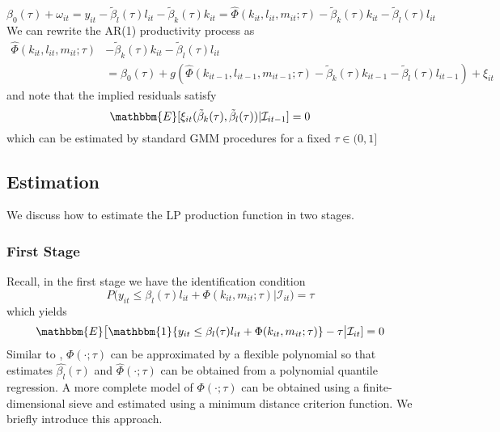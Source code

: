 \documentclass[11pt]{article}
\begin{document}
\begin{equation}
\beta_{0}(\tau)+\omega_{it}=y_{it}-\tilde{\beta}_{l}(\tau)l_{it}-\tilde{\beta}_{k}(\tau)k_{it}=\hat{\Phi}(k_{it}, l_{it}, m_{it}; \tau)-\tilde{\beta}_{k}(\tau)k_{it}-\tilde{\beta}_{l}(\tau)l_{it}
\end{equation}
We can rewrite the AR(1) productivity process as
\begin{equation}
\begin{split}
\hat{\Phi}(k_{it}, l_{it}, m_{it}; \tau)&-\tilde{\beta}_{k}(\tau)k_{it}-\tilde{\beta}_{l}(\tau)l_{it}\\
&=\beta_{0}(\tau)+g(\hat{\Phi}(k_{it-1}, l_{it-1}, m_{it-1}; \tau)-\tilde{\beta}_{k}(\tau)k_{it-1}-\tilde{\beta}_{l}(\tau)l_{it-1})+\xi_{it}
\end{split}
\end{equation}
and note that the implied residuals satisfy
\begin{equation}
\mathbbm{E}[\xi_{it}(\tilde{\beta}_{k}(\tau), \tilde{\beta}_{l}(\tau))|\mathcal{I}_{it-1}]=0
\end{equation}
which can be estimated by standard GMM procedures for a fixed $\tau\in (0,1]$

\subsection{Estimation}
We discuss how to estimate the LP production function in two stages. 
\subsubsection*{First Stage}
Recall, in the first stage we have the identification condition
\begin{equation} 
	P\big(y_{it}\leq \beta_{l}(\tau)l_{it}+\Phi(k_{it}, m_{it}; \tau)\big|\mathcal{I}_{it})=\tau
\end{equation}
which yields
\begin{equation} 
	\mathbbm{E}\big[\mathbbm{1}\{y_{it}\leq \beta_{l}(\tau)l_{it}+\Phi(k_{it}, m_{it}; \tau)\}-\tau\big|\mathcal{I}_{it}]=0
\end{equation}
Similar to \cite{Olley1996}, $\Phi(\cdot;\tau)$ can be approximated by a flexible polynomial so that estimates $\hat{\beta_{l}}(\tau)$ and $\hat{\Phi}(\cdot;\tau)$ can be obtained from a polynomial quantile regression. A more complete model of $\Phi(\cdot;\tau)$ can be obtained using a finite-dimensional sieve and estimated using a minimum distance criterion function. We briefly introduce this approach.\\
\end{document}
